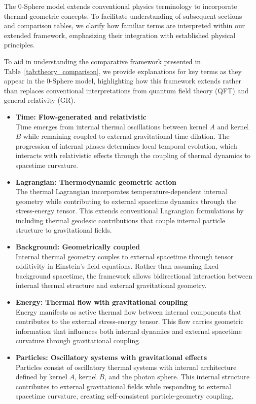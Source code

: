 \documentclass[%
 reprint,
 amsmath,amssymb,
 aps,
]{revtex4-1}
\numberwithin{equation}{section}%
\begin{document}
The 0-Sphere model extends conventional physics terminology to incorporate thermal-geometric concepts. To facilitate understanding of subsequent sections and comparison tables, we clarify how familiar terms are interpreted within our extended framework, emphasizing their integration with established physical principles.

To aid in understanding the comparative framework presented in Table~\ref{tab:theory_comparison}, we provide explanations for key terms as they appear in the 0-Sphere model, highlighting how this framework extends rather than replaces conventional interpretations from quantum field theory (QFT) and general relativity (GR).

\begin{itemize}
   \item \textbf{Time: Flow-generated and relativistic} \\
   Time emerges from internal thermal oscillations between kernel $A$ and kernel $B$ while remaining coupled to external gravitational time dilation. The progression of internal phases determines local temporal evolution, which interacts with relativistic effects through the coupling of thermal dynamics to spacetime curvature.

   \item \textbf{Lagrangian: Thermodynamic geometric action} \\
   The thermal Lagrangian incorporates temperature-dependent internal geometry while contributing to external spacetime dynamics through the stress-energy tensor. This extends conventional Lagrangian formulations by including thermal geodesic contributions that couple internal particle structure to gravitational fields.

   \item \textbf{Background: Geometrically coupled} \\
   Internal thermal geometry couples to external spacetime through tensor additivity in Einstein's field equations. Rather than assuming fixed background spacetime, the framework allows bidirectional interaction between internal thermal structure and external gravitational geometry.

   \item \textbf{Energy: Thermal flow with gravitational coupling} \\
   Energy manifests as active thermal flow between internal components that contributes to the external stress-energy tensor. This flow carries geometric information that influences both internal dynamics and external spacetime curvature through gravitational coupling.

   \item \textbf{Particles: Oscillatory systems with gravitational effects} \\
   Particles consist of oscillatory thermal systems with internal architecture defined by kernel $A$, kernel $B$, and the photon sphere. This internal structure contributes to external gravitational fields while responding to external spacetime curvature, creating self-consistent particle-geometry coupling.
\end{itemize}
\end{document}
